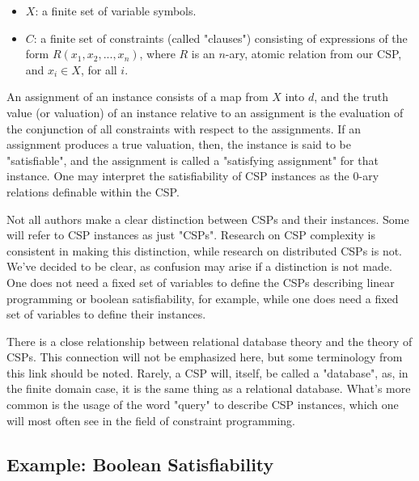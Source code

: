 \begin{itemize}
  \item $X$: a finite set of variable symbols.
  \item $C$: a finite set of constraints (called "clauses") consisting of expressions of the form $R(x_1,x_2,...,x_n)$, where $R$ is an $n$-ary, atomic relation from our CSP, and $x_i \in X$, for all $i$.
\end{itemize}

An assignment of an instance consists of a map from $X$ into $d$, and the truth value (or valuation) of an instance relative to an assignment is the evaluation of the conjunction of all constraints with respect to the assignments. If an assignment produces a true valuation, then, the instance is said to be "satisfiable", and the assignment is called a "satisfying assignment" for that instance. One may interpret the satisfiability of CSP instances as the 0-ary relations definable within the CSP.

\begin{remark}\label{remark:instance-terminology}
Not all authors make a clear distinction between CSPs and their instances. Some will refer to CSP instances as just "CSPs". Research on CSP complexity is consistent in making this distinction, while research on distributed CSPs is not. We've decided to be clear, as confusion may arise if a distinction is not made. One does not need a fixed set of variables to define the CSPs describing linear programming or boolean satisfiability, for example, while one does need a fixed set of variables to define their instances.
\end{remark}

\begin{remark}\label{remark:relational-database-terminology}
There is a close relationship between relational database theory and the theory of CSPs. This connection will not be emphasized here, but some terminology from this link should be noted. Rarely, a CSP will, itself, be called a "database", as, in the finite domain case, it is the same thing as a relational database. What's more common is the usage of the word "query" to describe CSP instances, which one will most often see in the field of constraint programming.
\end{remark}

\subsection{Example: Boolean Satisfiability}\label{sec:two-sat}

